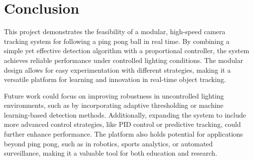 \documentclass[
    parskip=half, 
    twoside=false,
    twocolumn=true,
    fontsize=12pt,
]{scrarticle}
\begin{document}
\section{Conclusion}
This project demonstrates the feasibility of a modular, high-speed camera tracking system for following a ping pong ball in real time. By combining a simple yet effective detection algorithm with a proportional controller, the system achieves reliable performance under controlled lighting conditions. The modular design allows for easy experimentation with different strategies, making it a versatile platform for learning and innovation in real-time object tracking.

Future work could focus on improving robustness in uncontrolled lighting environments, such as by incorporating adaptive thresholding or machine learning-based detection methods. Additionally, expanding the system to include more advanced control strategies, like PID control or predictive tracking, could further enhance performance. The platform also holds potential for applications beyond ping pong, such as in robotics, sports analytics, or automated surveillance, making it a valuable tool for both education and research.
\end{document}
